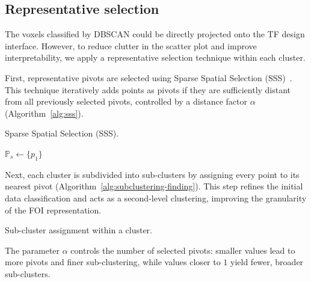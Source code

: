 \subsection{Representative selection}
\label{subsect:representative-selection}

The voxels classified by DBSCAN could be directly projected onto the TF design interface. However, to reduce clutter in the scatter plot and improve interpretability, we apply a representative selection technique within each cluster.

First, representative pivots are selected using Sparse Spatial Selection (SSS)~\cite{pedreira2007}. This technique iteratively adds points as pivots if they are sufficiently distant from all previously selected pivots, controlled by a distance factor $\alpha$ (Algorithm~\ref{alg:sss}).

\begin{algorithm}
    \caption{Sparse Spatial Selection (SSS).}
    \label{alg:sss}
    $\mathbb{P}_s \gets \{p_1\}$ \\
\end{algorithm}

Next, each cluster is subdivided into sub-clusters by assigning every point to its nearest pivot (Algorithm~\ref{alg:subclustering-finding}). This step refines the initial data classification and acts as a second-level clustering, improving the granularity of the FOI representation.

\begin{algorithm}
    \caption{Sub-cluster assignment within a cluster.}
    \label{alg:subclustering-finding}
\end{algorithm}

The parameter $\alpha$ controls the number of selected pivots: smaller values lead to more pivots and finer sub-clustering, while values closer to $1$ yield fewer, broader sub-clusters.
